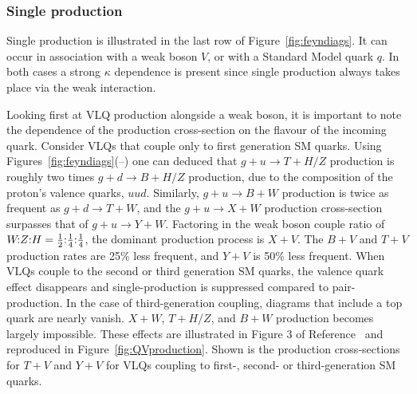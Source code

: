\subsubsection{Single production}
Single production is illustrated in the last row of Figure~\ref{fig:feyndiags}. It can occur in association with a weak boson $V$, or with a Standard Model quark $q$. In both cases a strong $\kappa$ dependence is present since single production always takes place via the weak interaction. 

Looking first at VLQ production alongside a weak boson, it is important to note the dependence of the production cross-section on the flavour of the incoming quark. Consider VLQs that couple only to first generation SM quarks. Using Figures~\ref{fig:feyndiags}(--) one can deduced that $g + u \rightarrow T+H/Z$ production is roughly two times $g + d \rightarrow B+H/Z$ production, due to the composition of the proton's valence quarks, $uud$. Similarly, $g + u \rightarrow B+W$ production is twice as frequent as  $g + d \rightarrow T+W$, and the $g + u \rightarrow X+W$ production cross-section surpasses that of $g + u \rightarrow Y+W$. Factoring in the weak boson couple ratio of  $\text{$W\!$:$Z$:$H$} = \text{$\tfrac{1}{2}$:$\tfrac{1}{4}$:$\tfrac{1}{4}$}$, the dominant production process is $X+V$. The $B+V$ and $T+V$ production rates are 25\% less frequent, and $Y+V$ is 50\% less frequent. When VLQs couple to the second or third generation SM quarks, the valence quark effect disappears and single-production is suppressed compared to pair-production. In the case of third-generation coupling, diagrams that include a top quark are nearly vanish. $X+W$, $T+H/Z$, and $B+W$ production becomes largely impossible. These effects are illustrated in Figure 3 of Reference~\cite{VLQ_contur} and reproduced in Figure~\ref{fig:QVproduction}. Shown is the production cross-sections for $T+V$ and $Y+V$ for VLQs coupling to first-, second- or third-generation SM quarks. 

